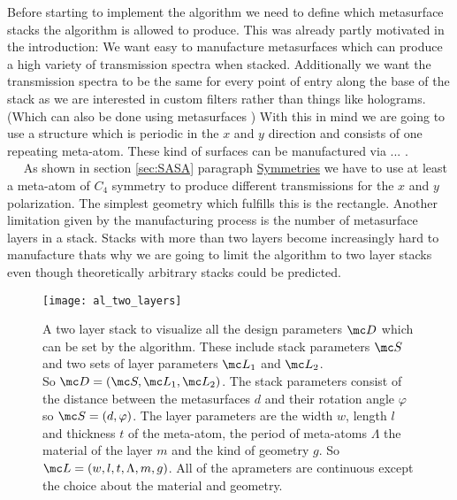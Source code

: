 Before starting to implement the algorithm we need to define which metasurface stacks the algorithm is allowed to produce. This was already partly motivated in the introduction: We want easy to manufacture metasurfaces which can produce a high variety of transmission spectra when stacked. Additionally we want the transmission spectra to be the same for every point of entry along the base of the stack as we are interested in custom filters rather than things like holograms. (Which can also be done using metasurfaces \cite{Mueller2017})
With this in mind we are going to use a structure which is periodic in the
$x$ and $y$ direction and consists of one repeating meta-atom. These kind of surfaces can be manufactured via ... .
\\

$\quad$ As shown in section \ref{sec:SASA} paragraph \hyperref[sec:symmetries]{Symmetries} we have to use at least a meta-atom of $C_4$ symmetry to produce different transmissions for the $x$ and $y$ polarization. The simplest geometry which fulfills this is the rectangle. Another limitation given by the manufacturing process is the number of metasurface layers in a stack. Stacks with more than two layers become increasingly hard to manufacture thats why we are going to limit the algorithm to two layer stacks even though theoretically arbitrary stacks could be predicted.
\\

\begin{figure}[H]
    \centering
    \texttt{[image: al\_two\_layers]}
    \caption{A two layer stack to visualize all the design parameters
    $\mc D$ which can be set by the algorithm. These include stack parameters $\mc S$ and two sets of layer parameters $\mc L_1$ and $\mc L_2$.\\
    So $\mc D = (\mc S, \mc L_1, \mc L_2)$. The stack parameters consist of the distance between the metasurfaces $d$ and their rotation angle $\varphi$ so $\mc S = (d, \varphi)$. The layer parameters are the width $w$, length $l$ and thickness $t$ of the meta-atom, the period of meta-atoms $\Lambda$ the  material of the layer $m$ and the kind of geometry $g$. So $\mc L = (w,l,t,\Lambda,m,g)$. All of the aprameters are continuous except the choice about the material and geometry.}
    \label{fig:al:two_layers}
\end{figure}


